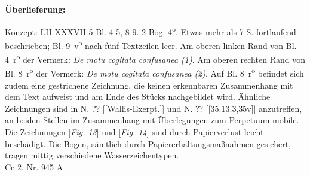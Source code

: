 \begin{ledgroupsized}[r]{120mm}
\footnotesize
\pstart
\noindent\textbf{\"{U}berlieferung:}   
\pend
\end{ledgroupsized}
\begin{ledgroupsized}[r]{114mm}
\footnotesize
\pstart
\parindent -6mm
Konzept: LH XXXVII 5 Bl. 4-5, 8-9. 2 Bog. 4\textsuperscript{o}. Etwas mehr als 7 S. fortlaufend beschrieben; Bl. 9~v\textsuperscript{o} nach fünf Textzeilen leer. Am oberen linken Rand von Bl. 4~r\textsuperscript{o} der Vermerk: \textit{De motu cogitata confusanea (1)}. Am oberen rechten Rand von Bl. 8~r\textsuperscript{o} der Vermerk: \textit{De motu cogitata confusanea (2)}. Auf Bl. 8~r\textsuperscript{o} befindet sich zudem eine gestrichene Zeichnung, die keinen erkennbaren Zusammenhang mit dem Text aufweist und am Ende des St\"{u}cks nachgebildet wird. \"{A}hnliche Zeichnungen sind in N. ?? [[Wallis-Exerpt.]] und N. ?? [[35.13.3,35v]] anzutreffen, an beiden Stellen im Zusammenhang mit \"{U}berlegungen zum Perpetuum mobile. Die Zeichnungen [\textit{Fig. 13}] und [\textit{Fig. 14}] sind durch Papierverlust leicht besch\"{a}digt. Die Bogen, s\"{a}mtlich durch Papiererhaltungsma{\ss}nahmen gesichert, tragen mittig verschiedene Wasserzeichentypen. \\Cc 2, Nr. 945 A
\pend
\end{ledgroupsized}

